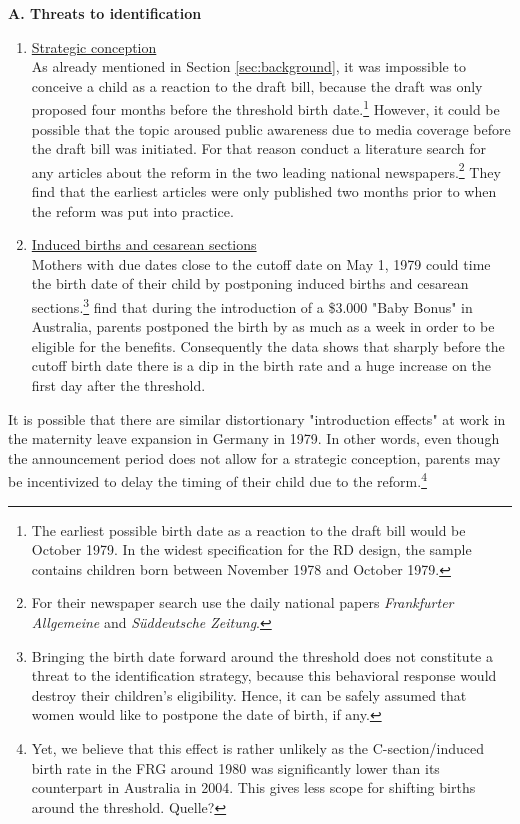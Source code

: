 \documentclass[11pt, a4paper]{article} %
\begin{document}
\bigskip\bigskip
\textbf{A. Threats to identification}
\begin{enumerate}
	\item \underline{Strategic conception}\\ As already mentioned in Section \ref{sec:background}, it was impossible to conceive a child as a reaction to the draft bill, because the draft was only proposed four months before the threshold birth date.\footnote{The earliest possible birth date as a reaction to the draft bill would be October 1979. In the widest specification for the RD design, the sample contains children born between November 1978 and October 1979.} However, it could be possible that the topic aroused public awareness due to media coverage before the draft bill was initiated. For that reason \cite{Dustmann2012} conduct a literature search for any articles about the reform in the two leading national newspapers.\footnote{For their newspaper search \cite{Dustmann2012} use the daily national papers \emph{Frankfurter Allgemeine} and \emph{Süddeutsche Zeitung}.} They find that the earliest articles were only published two months prior to when the reform was put into practice.
	
	\item \underline{Induced births and cesarean sections}\\ Mothers with due dates close to the cutoff date on May 1, 1979 could time the birth date of their child by postponing induced births and cesarean sections.\footnote{Bringing the birth date forward around the threshold does not constitute a threat to the identification strategy, because this behavioral response would destroy their children's eligibility. Hence, it can be safely assumed that women would like to postpone the date of birth, if any.} \cite{gans2009born} find that during the introduction of a \$3.000 "Baby Bonus" in Australia, parents postponed the birth by as much as a week in order to be eligible for the benefits. Consequently the data shows that sharply before the cutoff birth date there is a dip in the birth rate and a huge increase on the first day after the threshold.
\end{enumerate}
It is possible that there are similar distortionary "introduction effects" at work in the maternity leave expansion in Germany in 1979. In other words, even though the announcement period does not allow for a strategic conception, parents may be incentivized to delay the timing of their child due to the reform.\footnote{Yet, we believe that this effect is rather unlikely as the C-section/induced birth rate in the FRG around 1980 was significantly lower than its counterpart in Australia in 2004. This gives less scope for shifting births around the threshold. {\color{red} Quelle?}}
\end{document}
